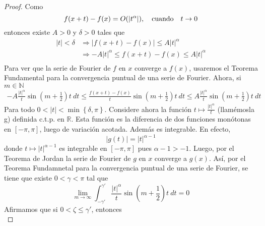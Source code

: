 \documentclass[12pt]{report}
\theoremstyle{largebreak}
\renewcommand{\leq}{\ensuremath{\leqslant}}
\newcommand\abs[1]{\ensuremath{\left|#1\right|}}
\begin{document}
    \begin{proof}
        Como
        \begin{equation*}
            f(x+t)-f(x)=O(\abs{t^\alpha}),\quad\textup{cuando}\quad t\rightarrow 0
        \end{equation*}
        entonces existe $A>0$ y $\delta>0$ tales que
        \begin{equation*}
            \begin{split}
                \abs{t}<\delta&\Rightarrow \abs{f(x+t)-f(x)}\leq A\abs{t}^\alpha\\
                &\Rightarrow -A\abs{t}^\alpha\leq f(x+t)-f(x)\leq A\abs{t}^\alpha\\
            \end{split}
        \end{equation*}
        Para ver que la serie de Fourier de $f$ en $x$ converge a $f(x)$, usaremos el Teorema Fundamental para la convergencia puntual de una serie de Fourier. Ahora, si $m\in\mathbb{N}$
        \begin{equation*}
            \begin{split}
                -A\frac{\abs{t}^\alpha}{t}\sin\left(m+\frac{1}{2}\right)t\:dt \leq \frac{f(x+t)-f(x)}{t}\sin\left(m+\frac{1}{2}\right)t\:dt\leq A\frac{\abs{t}^\alpha}{t}\sin\left(m+\frac{1}{2}\right)t\:dt
            \end{split}
        \end{equation*}
        Para todo $0<\abs{t}<\min\left\{\delta,\pi\right\}$. Considere ahora la función $t\mapsto\frac{\abs{t}^\alpha}{t}$ (llamémosla g) definida c.t.p. en $\mathbb{R}$. Esta función es la diferencia de dos funciones monótonas en $[-\pi,\pi]$, luego de variación acotada. Además es integrable. En efecto,
        \begin{equation*}
            \abs{g(t)}=\abs{t}^{\alpha-1}
        \end{equation*}
        donde $t\mapsto \abs{t}^{\alpha-1}$ es integrable en $[-\pi,\pi]$ pues $\alpha-1>-1$. Luego, por el Teorema de Jordan la serie de Fourier de $g$ en $x$ converge a $g(x)$. Así, por el Teorema Fundamnetal para la convergencia puntual de una serie de Fourier, se tiene que existe $0<\gamma<\pi$ tal que
        \begin{equation*}
            \lim_{ m\rightarrow\infty}\int_{-\gamma'}^{\gamma'}\frac{\abs{t}^\alpha}{t}\sin\left(m+\frac{1}{2}\right)t\:dt=0
        \end{equation*}
        Afirmamos que si $0<\zeta\leq\gamma'$, entonces
        \begin{equation*}

\end{equation*}
\end{proof}
\end{document}
